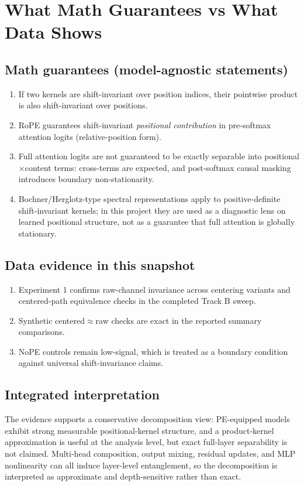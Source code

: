\documentclass[11pt]{article}
\begin{document}
\section{What Math Guarantees vs What Data Shows}
\subsection*{Math guarantees (model-agnostic statements)}
\begin{enumerate}[leftmargin=*]
  \item If two kernels are shift-invariant over position indices, their pointwise product is also shift-invariant over positions.
  \item RoPE guarantees shift-invariant \emph{positional contribution} in pre-softmax attention logits (relative-position form).
  \item Full attention logits are not guaranteed to be exactly separable into positional$\times$content terms: cross-terms are expected, and post-softmax causal masking introduces boundary non-stationarity.
  \item Bochner/Herglotz-type spectral representations apply to positive-definite shift-invariant kernels; in this project they are used as a diagnostic lens on learned positional structure, not as a guarantee that full attention is globally stationary.
\end{enumerate}

\subsection*{Data evidence in this snapshot}
\begin{enumerate}[leftmargin=*]
  \item Experiment 1 confirms raw-channel invariance across centering variants and centered-path equivalence checks in the completed Track B sweep.
  \item Synthetic centered$\approx$raw checks are exact in the reported summary comparisons.
  \item NoPE controls remain low-signal, which is treated as a boundary condition against universal shift-invariance claims.
\end{enumerate}

\subsection*{Integrated interpretation}
The evidence supports a conservative decomposition view: PE-equipped models exhibit strong measurable positional-kernel structure, and a product-kernel approximation is useful at the analysis level, but exact full-layer separability is not claimed. Multi-head composition, output mixing, residual updates, and MLP nonlinearity can all induce layer-level entanglement, so the decomposition is interpreted as approximate and depth-sensitive rather than exact.
\end{document}
